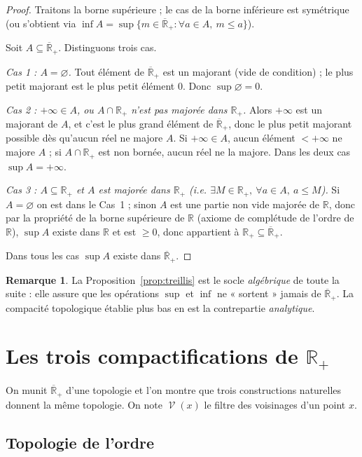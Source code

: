 \documentclass[11pt,a4paper]{article}
\theoremstyle{plain}
\theoremstyle{definition}
\newtheorem{remark}[theorem]{Remarque}
\newcommand{\R}{\mathbb{R}}
\newcommand{\Rp}{\mathbb{R}_+}
\newcommand{\Rpb}{\overline{\mathbb{R}}_+}
\DeclareMathOperator{\Vois}{\mathcal{V}}
\begin{document}
\begin{proof}
Traitons la borne supérieure ; le cas de la borne inférieure est symétrique
(ou s'obtient via $\inf A=\sup\{m\in\Rpb: \forall a\in A,\ m\le a\}$).

Soit $A\subseteq\Rpb$. Distinguons trois cas.

\emph{Cas 1 : $A=\varnothing$.} Tout élément de $\Rpb$ est un majorant (vide de
condition) ; le plus petit majorant est le plus petit élément $0$. Donc
$\sup\varnothing=0$.

\emph{Cas 2 : $+\infty\in A$, ou $A\cap\Rp$ n'est pas majorée dans $\Rp$.}
Alors $+\infty$ est un majorant de $A$, et c'est le plus grand élément de
$\Rpb$, donc le plus petit majorant possible dès qu'aucun réel ne majore $A$.
Si $+\infty\in A$, aucun élément $<+\infty$ ne majore $A$ ; si $A\cap\Rp$ est
non bornée, aucun réel ne la majore. Dans les deux cas $\sup A=+\infty$.

\emph{Cas 3 : $A\subseteq\Rp$ et $A$ est majorée dans $\Rp$ (i.e. $\exists
M\in\Rp,\ \forall a\in A,\ a\le M$).} Si $A=\varnothing$ on est dans le Cas~1 ;
sinon $A$ est une partie non vide majorée de $\R$, donc par la propriété de la
borne supérieure de $\R$ (axiome de complétude de l'ordre de $\R$), $\sup A$
existe dans $\R$ et est $\ge0$, donc appartient à $\Rp\subseteq\Rpb$.

Dans tous les cas $\sup A$ existe dans $\Rpb$.
\end{proof}

\begin{remark}
La Proposition~\ref{prop:treillis} est le socle \emph{algébrique} de toute la
suite : elle assure que les opérations $\sup$ et $\inf$ ne « sortent » jamais de
$\Rpb$. La compacité topologique établie plus bas en est la contrepartie
\emph{analytique}.
\end{remark}

\section{Les trois compactifications de $\Rp$}

On munit $\Rpb$ d'une topologie et l'on montre que trois constructions
naturelles donnent la même topologie. On note $\Vois(x)$ le filtre des
voisinages d'un point $x$.

\subsection{Topologie de l'ordre}
\end{document}
